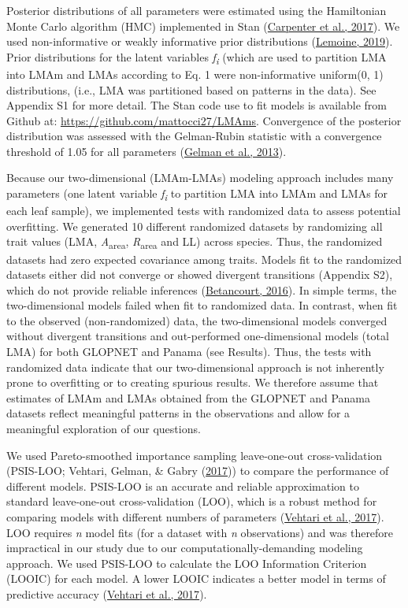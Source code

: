 \documentclass[
  12pt,
  letterpaper,
  DIV=11,
  numbers=noendperiod]{scrartcl}
\begin{document}
Posterior distributions of all parameters were estimated using the
Hamiltonian Monte Carlo algorithm (HMC) implemented in Stan
(\protect\hyperlink{ref-Carpenter2017}{Carpenter et al., 2017}). We used
non-informative or weakly informative prior distributions
(\protect\hyperlink{ref-Lemoine2019}{Lemoine, 2019}). Prior
distributions for the latent variables \emph{f\textsubscript{i}} (which
are used to partition LMA into LMAm and LMAs according to Eq. 1 were
non-informative uniform(0, 1) distributions, (i.e., LMA was partitioned
based on patterns in the data). See Appendix S1 for more detail. The
Stan code use to fit models is available from Github at:
\url{https://github.com/mattocci27/LMAms}. Convergence of the posterior
distribution was assessed with the Gelman-Rubin statistic with a
convergence threshold of 1.05 for all parameters
(\protect\hyperlink{ref-Gelman2013}{Gelman et al., 2013}).

Because our two-dimensional (LMAm-LMAs) modeling approach includes many
parameters (one latent variable \emph{f\textsubscript{i}} to partition
LMA into LMAm and LMAs for each leaf sample), we implemented tests with
randomized data to assess potential overfitting. We generated 10
different randomized datasets by randomizing all trait values (LMA,
\emph{A}\textsubscript{area}, \emph{R}\textsubscript{area} and LL)
across species. Thus, the randomized datasets had zero expected
covariance among traits. Models fit to the randomized datasets either
did not converge or showed divergent transitions (Appendix S2), which do
not provide reliable inferences
(\protect\hyperlink{ref-Betancourt2016}{Betancourt, 2016}). In simple
terms, the two-dimensional models failed when fit to randomized data. In
contrast, when fit to the observed (non-randomized) data, the
two-dimensional models converged without divergent transitions and
out-performed one-dimensional models (total LMA) for both GLOPNET and
Panama (see Results). Thus, the tests with randomized data indicate that
our two-dimensional approach is not inherently prone to overfitting or
to creating spurious results. We therefore assume that estimates of LMAm
and LMAs obtained from the GLOPNET and Panama datasets reflect
meaningful patterns in the observations and allow for a meaningful
exploration of our questions.

We used Pareto-smoothed importance sampling leave-one-out
cross-validation (PSIS-LOO; Vehtari, Gelman, \& Gabry
(\protect\hyperlink{ref-Vehtari2017}{2017})) to compare the performance
of different models. PSIS-LOO is an accurate and reliable approximation
to standard leave-one-out cross-validation (LOO), which is a robust
method for comparing models with different numbers of parameters
(\protect\hyperlink{ref-Vehtari2017}{Vehtari et al., 2017}). LOO
requires \emph{n} model fits (for a dataset with \emph{n} observations)
and was therefore impractical in our study due to our
computationally-demanding modeling approach. We used PSIS-LOO to
calculate the LOO Information Criterion (LOOIC) for each model. A lower
LOOIC indicates a better model in terms of predictive accuracy
(\protect\hyperlink{ref-Vehtari2017}{Vehtari et al., 2017}).
\end{document}
